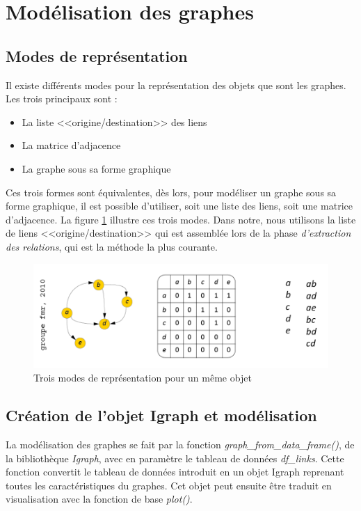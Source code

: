  
\section{Modélisation des graphes}
\subsection{Modes de représentation}
Il existe différents modes pour la représentation des objets que sont les graphes. Les trois principaux sont :
\begin{itemize}
    \item La liste <<origine/destination>> des liens
    \item La matrice d'adjacence
    \item La graphe sous sa forme graphique
\end{itemize}

Ces trois formes sont équivalentes, dès lors, pour modéliser un graphe sous sa forme graphique, il est possible d'utiliser, soit une liste des liens, soit une matrice d'adjacence. La figure \ref{fig:representation_graphes} illustre ces trois modes. Dans notre,  nous utilisons la liste de liens  <<origine/destination>> qui est assemblée lors de la phase \textit{d'extraction des relations}, qui est la méthode la plus courante.
\begin{figure}
    \centering
    \includegraphics[scale=0.75]{3.Results/Img/mode_de_representation_graphes.png}
    \caption{Trois modes de représentation pour un même objet}
    \label{fig:representation_graphes}
\end{figure}

\subsection{Création de l'objet Igraph et modélisation}
La modélisation des graphes se fait par la fonction  \textit{graph\_from\_data\_frame()}, de la bibliothèque \textit{Igraph}, avec en paramètre le tableau de données \textit{df\_links}.
Cette fonction convertit le tableau de données introduit  en un objet Igraph  reprenant toutes les caractéristiques du graphes. Cet objet peut ensuite être traduit en visualisation  avec la fonction de base \textit{plot()}.

